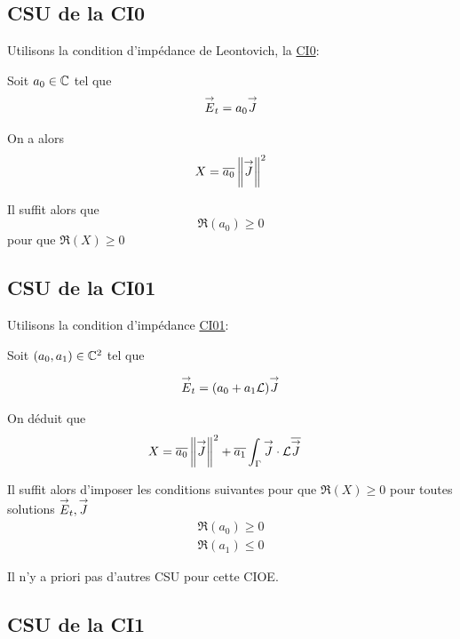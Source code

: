   \subsection{CSU de la CI0}
    Utilisons la condition d’impédance de Leontovich, la \hyperlink{ci0}{CI0}:

    Soit \(a_0 \in \mathbb C\) tel que
    \begin{align*}
      {\overset{\rightarrow}{E}}_t = a_0 {\overset{\rightarrow}{J}}
    \end{align*}

    On a alors
    \begin{equation*}
      X = {\overline{a_0}}\left\lVert{\overset{\rightarrow}{J}}\right\rVert^2
    \end{equation*}

    Il suffit alors que
    \begin{equation}
      \Re\left(a_0\right) \ge 0
    \end{equation}
    pour que \(\Re(X)\ge0\)

  \subsection{CSU de la CI01}
    Utilisons la condition d’impédance \hyperlink{ci01}{CI01}:

    Soit \((a_0, a_1) \in \mathbb C^2\) tel que

    \begin{align*}
      {\overset{\rightarrow}{E}}_t = (a_0 +a_1 \mathcal{L}){\overset{\rightarrow}{J}}
    \end{align*}

    On déduit que
    \begin{align*}
      X & = {\overline{a_0}} \left\lVert{\overset{\rightarrow}{J}}\right\rVert ^2 + {\overline{a_1}}\int_\Gamma {\overset{\rightarrow}{J}}\cdot \mathcal{L}{\overline{{\overset{\rightarrow}{J}}}}
    \end{align*}

    Il suffit alors d'imposer les conditions suivantes pour que \(\Re(X)\ge 0\) pour toutes solutions \({\overset{\rightarrow}{E}}_t,{\overset{\rightarrow}{J}}\)
    \begin{align}
      \Re\left(a_0\right) \ge 0\\
      \Re\left(a_1\right) \le 0
    \end{align}

    Il n'y a priori pas d'autres CSU pour cette CIOE.

  \subsection{CSU de la CI1}


